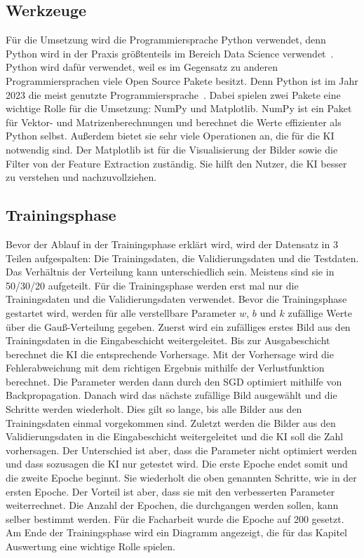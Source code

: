 \documentclass[11pt]{article}
\begin{document}
\subsection{Werkzeuge}
Für die Umsetzung wird die Programmiersprache Python verwendet, denn Python wird in der Praxis größtenteils im Bereich Data Science verwendet~\cite{20}.
Python wird dafür verwendet, weil es im Gegensatz zu anderen Programmiersprachen viele Open Source Pakete besitzt.
Denn Python ist im Jahr 2023 die meist genutzte Programmiersprache~\cite{21}. Dabei spielen zwei Pakete eine wichtige Rolle für die Umsetzung:
NumPy und Matplotlib. NumPy ist ein Paket für Vektor- und Matrizenberechnungen und berechnet die Werte effizienter als Python selbst. Außerdem
bietet sie sehr viele Operationen an, die für die KI notwendig sind. Der Matplotlib ist für die Visualisierung der Bilder sowie die Filter von der
Feature Extraction zuständig. Sie hilft den Nutzer, die KI besser zu verstehen und nachzuvollziehen.

\subsection{Trainingsphase}
Bevor der Ablauf in der Trainingsphase erklärt wird, wird der Datensatz in 3 Teilen aufgespalten: Die Trainingsdaten, die Validierungsdaten
und die Testdaten. Das Verhältnis der Verteilung kann unterschiedlich sein. Meistens sind sie in 50/30/20 aufgeteilt.
Für die Trainingsphase werden erst mal nur die Trainingsdaten und die Validierungsdaten verwendet.
Bevor die Trainingsphase gestartet wird, werden für alle verstellbare Parameter $w$, $b$ und $k$ zufällige Werte über
die Gauß-Verteilung gegeben. Zuerst wird ein zufälliges erstes Bild aus den Trainingsdaten in die Eingabeschicht weitergeleitet.
Bis zur Ausgabeschicht berechnet die KI die entsprechende Vorhersage. Mit der Vorhersage wird die Fehlerabweichung mit dem richtigen
Ergebnis mithilfe der Verlustfunktion berechnet. Die Parameter werden dann durch den SGD optimiert mithilfe von Backpropagation.
Danach wird das nächste zufällige Bild ausgewählt und die Schritte werden wiederholt. Dies gilt so lange, bis alle Bilder aus
den Trainingsdaten einmal vorgekommen sind. Zuletzt werden die Bilder aus den Validierungsdaten
in die Eingabeschicht weitergeleitet und die KI soll die Zahl vorhersagen. Der Unterschied ist aber, dass die Parameter nicht optimiert werden
und dass sozusagen die KI nur getestet wird. Die erste Epoche endet somit und die zweite Epoche beginnt. Sie wiederholt die oben genannten Schritte,
wie in der ersten Epoche. Der Vorteil ist aber, dass sie mit den verbesserten Parameter weiterrechnet. Die Anzahl der Epochen, die durchgangen
werden sollen, kann selber bestimmt werden. Für die Facharbeit wurde die Epoche auf 200 gesetzt. Am Ende der Trainingsphase wird ein Diagramm
angezeigt, die für das Kapitel Auswertung eine wichtige Rolle spielen.
\end{document}

